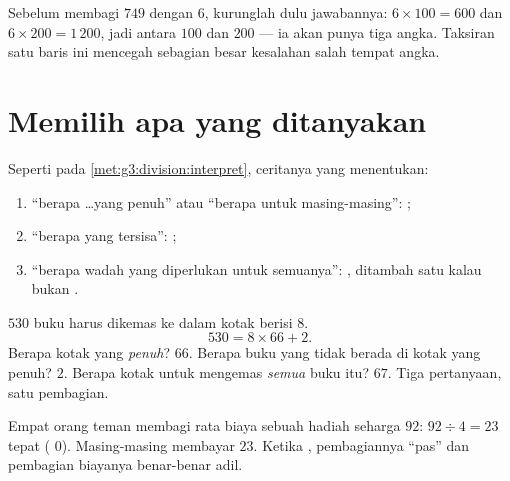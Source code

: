 \begin{example}\label{ex:g4:division:size}
Sebelum membagi $749$ dengan $6$, kurunglah dulu jawabannya:
$6 \times 100 = 600$ dan $6 \times 200 = 1\,200$, jadi 
antara $100$ dan $200$ --- ia akan punya tiga angka. Taksiran satu
baris ini mencegah sebagian besar kesalahan salah tempat angka.
\end{example}

\section{Memilih apa yang ditanyakan}

\begin{method}\label{met:g4:division:interpret}
Seperti pada \cref{met:g3:division:interpret}, ceritanya yang menentukan:
\begin{enumerate}
  \item ``berapa \dots yang penuh'' atau ``berapa untuk
        masing-masing'': ;
  \item ``berapa yang tersisa'': ;
  \item ``berapa wadah yang diperlukan untuk semuanya'': , ditambah satu kalau  bukan .
\end{enumerate}
\end{method}

\begin{example}\label{ex:g4:division:problem}
$530$ buku harus dikemas ke dalam kotak berisi $8$.
\[
530 = 8 \times 66 + 2 .
\]
Berapa kotak yang \emph{penuh}? $66$. Berapa buku yang tidak berada
di kotak yang penuh? $2$. Berapa kotak untuk mengemas \emph{semua}
buku itu? $67$. Tiga pertanyaan, satu pembagian.
\end{example}

\begin{example}\label{ex:g4:division:money}
Empat orang teman membagi rata biaya sebuah hadiah seharga $92$:
$92 \div 4 = 23$ tepat ( $0$). Masing-masing membayar $23$.
Ketika  , pembagiannya ``pas'' dan pembagian biayanya
benar-benar adil.
\end{example}

